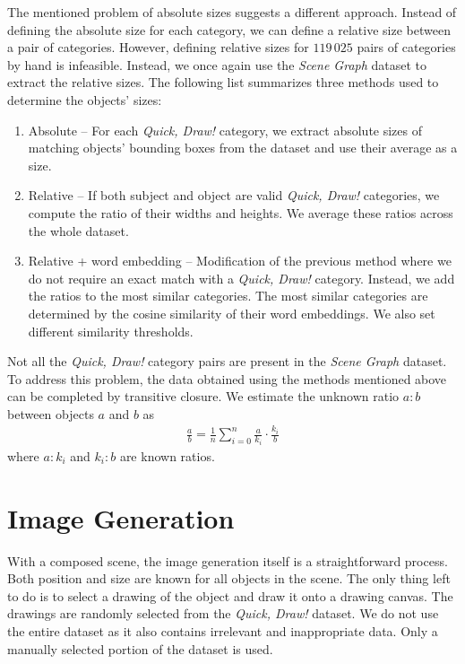 \medskip

The mentioned problem of absolute sizes suggests a different approach. Instead of defining the absolute size for each category, we can define a relative size between a pair of categories. However, defining relative sizes for $119\,025$ pairs of categories by hand is infeasible. Instead, we once again use the \emph{Scene Graph} \citep{xu2017scenegraph} dataset to extract the relative sizes. The following list summarizes three methods used to determine the objects' sizes:
\begin{enumerate}
    \item Absolute -- For each \emph{Quick, Draw!} category, we extract absolute sizes of matching objects' bounding boxes from the dataset and use their average as a size.
    \item Relative -- If both subject and object are valid \emph{Quick, Draw!} categories, we compute the ratio of their widths and heights. We average these ratios across the whole dataset.
    \item Relative + word embedding -- Modification of the previous method where we do not require an exact match with a \emph{Quick, Draw!} category. Instead, we add the ratios to the most similar categories. The most similar categories are determined by the cosine similarity of their word embeddings. We also set different similarity thresholds. 
\end{enumerate}

Not all the \emph{Quick, Draw!} category pairs are present in the \emph{Scene Graph} dataset. To address this problem, the data obtained using the methods mentioned above can be completed by transitive closure. We estimate the unknown ratio $a:b$ between objects $a$ and $b$ as 
\begin{align*}
\frac{a}{b} = \frac{1}{n} \sum_{i = 0}^n \frac{a}{k_i} \cdot \frac{k_i}{b}
\end{align*}
where $a:k_i$ and $k_i:b$ are known ratios.

\section{Image Generation}

With a composed scene, the image generation itself is a straightforward process. Both position and size are known for all objects in the scene. The only thing left to do is to select a drawing of the object and draw it onto a drawing canvas. The drawings are randomly selected from the \emph{Quick, Draw!} \citep{quickdraw} dataset. We do not use the entire dataset as it also contains irrelevant and inappropriate data. Only a manually selected portion of the dataset is used.
